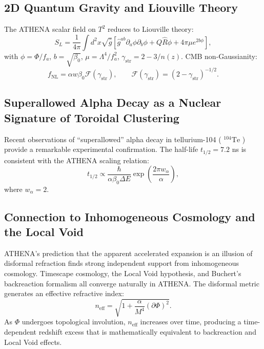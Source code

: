 \documentclass[11pt,a4paper]{article}
\begin{document}
\subsection{2D Quantum Gravity and Liouville Theory}
The ATHENA scalar field on \(T^2\) reduces to Liouville theory:
\begin{equation}
S_{L} = \frac{1}{4\pi}\int d^{2}x\sqrt{\hat{g}}\left[\hat{g}^{ab}\partial_{a}\phi \partial_{b}\phi +Q\hat{R}\phi +4\pi \mu e^{2b\phi}\right], \tag{40}
\end{equation}
with \(\phi = \Phi /f_{a}\), \(b = \sqrt{\beta_{0}}\), \(\mu = \Lambda^{4} / f_{a}^{2}\), \(\gamma_{\mathrm{str}} = 2 - 3 / n(z)\). CMB non-Gaussianity:
\begin{equation}
f_{\mathrm{NL}} = \alpha w\beta_{0}\mathcal{F}(\gamma_{\mathrm{str}}),\qquad \mathcal{F}(\gamma_{\mathrm{str}}) = (2 - \gamma_{\mathrm{str}})^{-1 / 2}. \tag{41}
\end{equation}

\subsection{Superallowed Alpha Decay as a Nuclear Signature of Toroidal Clustering}
Recent observations of ``superallowed'' alpha decay in tellurium-104 ( \(^{104}\mathrm{Te}\) ) provide a remarkable experimental confirmation. The half-life \(t_{1 / 2} = 7.2\) ns is consistent with the ATHENA scaling relation:
\begin{equation}
t_{1 / 2}\propto \frac{\hbar}{\alpha\beta_{0}\Delta E}\exp \left(\frac{2\pi w_{\alpha}}{\alpha}\right), \tag{42}
\end{equation}
where \(w_{\alpha} = 2\).

\subsection{Connection to Inhomogeneous Cosmology and the Local Void}
ATHENA's prediction that the apparent accelerated expansion is an illusion of disformal refraction finds strong independent support from inhomogeneous cosmology. Timescape cosmology, the Local Void hypothesis, and Buchert's backreaction formalism all converge naturally in ATHENA. The disformal metric generates an effective refractive index:
\begin{equation}
n_{\mathrm{eff}} = \sqrt{1 + \frac{\alpha}{M^4} (\partial \Phi)^2}. \tag{43}
\end{equation}
As \(\Phi\) undergoes topological involution, \(n_{\mathrm{eff}}\) increases over time, producing a time-dependent redshift excess that is mathematically equivalent to backreaction and Local Void effects.
\end{document}
